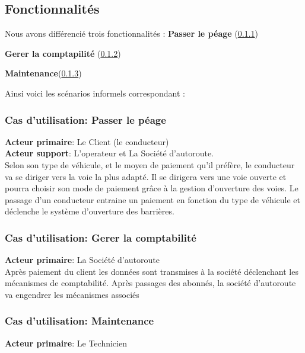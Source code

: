 \subsection{Fonctionnalités}
Nous avons différencié trois fonctionnalités :
\textbf{Passer le péage }(\ref{subsubsec:passerL})

\textbf{Gerer la comptapilité
} (\ref{subsubsec:gerer})

\textbf{Maintenance}(\ref{subsubsec:maint})

Ainsi voici les scénarios informels correspondant :
\subsubsection{\textbf{Cas d’utilisation:} Passer le péage } \label{subsubsec:passerL}
\textbf{Acteur primaire}: Le Client (le conducteur)\\

\textbf{Acteur support}: L’operateur et La Société d'autoroute.\\

Selon son type de véhicule, et le moyen de paiement qu’il préfère, le conducteur va se diriger vers la voie la plus adapté. Il se dirigera vers une voie ouverte et pourra choisir son mode de paiement grâce à la gestion d’ouverture des voies.
Le passage d’un conducteur entraine un paiement en fonction du type de véhicule et déclenche le système d’ouverture des barrières.


\subsubsection{\textbf{Cas d’utilisation:} Gerer la comptabilité}  \label{subsubsec:gerer}
\textbf{Acteur primaire}: La Société d'autoroute \\

Après paiement du client les données sont transmises à la société déclenchant les mécanismes de comptabilité. Après passages des abonnés, la société d’autoroute va engendrer les mécanismes associés

\subsubsection{\textbf{Cas d’utilisation:} Maintenance}  \label{subsubsec:maint}
\textbf{Acteur primaire}: Le Technicien  
